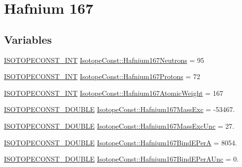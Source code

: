 \hypertarget{group___isotope_const-_hafnium-_hf167}{}\section{Hafnium 167}
\label{group___isotope_const-_hafnium-_hf167}
\subsection*{Variables}
\begin{DoxyCompactItemize}
\item 
\mbox{\hyperlink{group___isotope_const-_macros_ga5f18360b3e99483a35c32d789e62621c}{I\+S\+O\+T\+O\+P\+E\+C\+O\+N\+S\+T\+\_\+\+I\+NT}} \mbox{\hyperlink{group___isotope_const-_hafnium-_hf167_gacfc5ad91e191ebcee959e41ee756e7f9}{Isotope\+Const\+::\+Hafnium167\+Neutrons}} = 95
\item 
\mbox{\hyperlink{group___isotope_const-_macros_ga5f18360b3e99483a35c32d789e62621c}{I\+S\+O\+T\+O\+P\+E\+C\+O\+N\+S\+T\+\_\+\+I\+NT}} \mbox{\hyperlink{group___isotope_const-_hafnium-_hf167_ga56699aa207004d0341049ce9295cb9f9}{Isotope\+Const\+::\+Hafnium167\+Protons}} = 72
\item 
\mbox{\hyperlink{group___isotope_const-_macros_ga5f18360b3e99483a35c32d789e62621c}{I\+S\+O\+T\+O\+P\+E\+C\+O\+N\+S\+T\+\_\+\+I\+NT}} \mbox{\hyperlink{group___isotope_const-_hafnium-_hf167_gab832d2befe9aedf708355bd08cb05ddd}{Isotope\+Const\+::\+Hafnium167\+Atomic\+Weight}} = 167
\item 
\mbox{\hyperlink{group___isotope_const-_macros_ga8f45a7272ce02c0b4c65c44636ed719a}{I\+S\+O\+T\+O\+P\+E\+C\+O\+N\+S\+T\+\_\+\+D\+O\+U\+B\+LE}} \mbox{\hyperlink{group___isotope_const-_hafnium-_hf167_ga98b80de53603b18c87dd97b68d6c0e30}{Isotope\+Const\+::\+Hafnium167\+Mass\+Exc}} = -\/53467.
\item 
\mbox{\hyperlink{group___isotope_const-_macros_ga8f45a7272ce02c0b4c65c44636ed719a}{I\+S\+O\+T\+O\+P\+E\+C\+O\+N\+S\+T\+\_\+\+D\+O\+U\+B\+LE}} \mbox{\hyperlink{group___isotope_const-_hafnium-_hf167_ga8ffee49b0a66d0ff36e3cdf81af7628e}{Isotope\+Const\+::\+Hafnium167\+Mass\+Exc\+Unc}} = 27.
\item 
\mbox{\hyperlink{group___isotope_const-_macros_ga8f45a7272ce02c0b4c65c44636ed719a}{I\+S\+O\+T\+O\+P\+E\+C\+O\+N\+S\+T\+\_\+\+D\+O\+U\+B\+LE}} \mbox{\hyperlink{group___isotope_const-_hafnium-_hf167_gae71a43ecb271c8f5e5de604a8cfb75ec}{Isotope\+Const\+::\+Hafnium167\+Bind\+E\+PerA}} = 8054.
\item 
\mbox{\hyperlink{group___isotope_const-_macros_ga8f45a7272ce02c0b4c65c44636ed719a}{I\+S\+O\+T\+O\+P\+E\+C\+O\+N\+S\+T\+\_\+\+D\+O\+U\+B\+LE}} \mbox{\hyperlink{group___isotope_const-_hafnium-_hf167_gacd7e89ea942a53a8f55434f42d865be2}{Isotope\+Const\+::\+Hafnium167\+Bind\+E\+Per\+A\+Unc}} = 0.

\end{DoxyCompactItemize}
